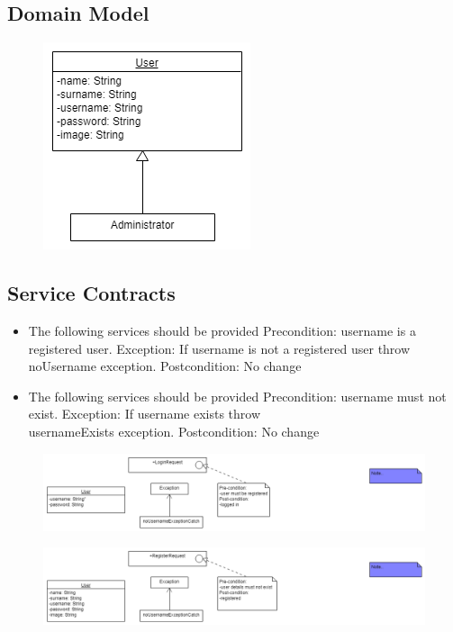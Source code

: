 \documentclass[12pt]{article}
\begin{document}
\subsection{Domain Model}
\begin{figure}[h]
\centering
\includegraphics[scale=1]{diagrams/usedom.png}
\end{figure}
\newpage
\subsection{Service Contracts}
\begin{itemize}
\item The following services should be provided
Precondition: username is a registered user.
Exception: If username is not a registered user throw \\noUsername exception.
Postcondition: No change
\item The following services should be provided
Precondition: username must not exist.
Exception: If username exists throw \\usernameExists exception.
Postcondition: No change
\end{itemize}
\begin{figure}[h]
\centering
\includegraphics[scale=0.7]{diagrams/useS.png}
\end{figure}

\begin{figure}[h]
\centering
\includegraphics[scale=0.7]{diagrams/useR.png}
\end{figure}
\newpage
\end{document}

